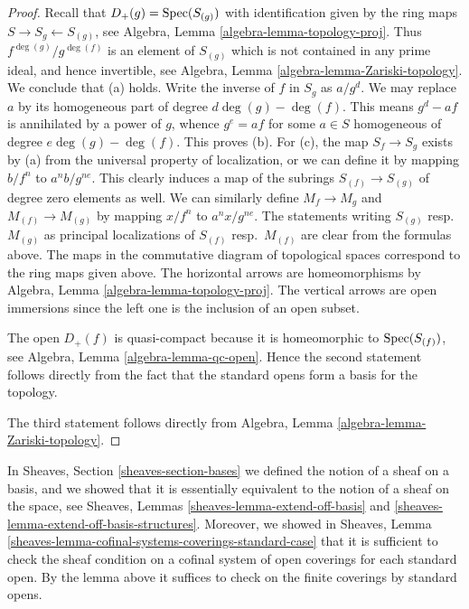 \begin{proof}
Recall that $D_{+}(g) = \mathop{\rm Spec}(S_{(g)})$ with identification
given by the ring maps $S \to S_g \leftarrow S_{(g)}$, see
Algebra, Lemma \ref{algebra-lemma-topology-proj}.
Thus $f^{\deg(g)}/g^{\deg(f)}$ is an element of $S_{(g)}$ which is not
contained in any prime ideal, and hence invertible,
see Algebra, Lemma \ref{algebra-lemma-Zariski-topology}.
We conclude that (a) holds.
Write the inverse of $f$ in $S_g$ as $a/g^d$.
We may replace $a$ by its homogeneous part of degree $d\deg(g) - \deg(f)$.
This means $g^d - af$ is annihilated by a power of $g$, whence
$g^e = af$ for some $a \in S$ homogeneous of degree $e\deg(g) - \deg(f)$.
This proves (b).
For (c), the map $S_f \to S_g$ exists by (a) from the universal property
of localization, or we can define it by mapping $b/f^n$
to $a^nb/g^{ne}$. This clearly induces a map of the subrings
$S_{(f)} \to S_{(g)}$ of degree zero elements as well.
We can similarly define $M_f \to M_g$ and $M_{(f)} \to M_{(g)}$ by mapping
$x/f^n$ to $a^nx/g^{ne}$. The statements writing $S_{(g)}$ resp.\ 
$M_{(g)}$ as principal localizations of $S_{(f)}$ resp.\ $M_{(f)}$
are clear from the formulas above. The maps in the commutative diagram
of topological spaces correspond to the ring maps given above. The
horizontal arrows are homeomorphisms by
Algebra, Lemma \ref{algebra-lemma-topology-proj}.
The vertical arrows are open immersions since the left
one is the inclusion of an open subset.

\medskip\noindent
The open $D_{+}(f)$ is quasi-compact because it is homeomorphic
to $\mathop{\rm Spec}(S_{(f)})$, see  Algebra, Lemma \ref{algebra-lemma-qc-open}.
Hence the second statement follows directly
from the fact that the standard opens form
a basis for the topology.

\medskip\noindent
The third statement follows directly from
Algebra, Lemma \ref{algebra-lemma-Zariski-topology}.
\end{proof}

\noindent
In Sheaves, Section \ref{sheaves-section-bases} we defined
the notion of a sheaf on a basis, and we showed that it is
essentially equivalent to the notion of a sheaf on the space,
see Sheaves, Lemmas \ref{sheaves-lemma-extend-off-basis} and
\ref{sheaves-lemma-extend-off-basis-structures}. Moreover,
we showed in
Sheaves, Lemma \ref{sheaves-lemma-cofinal-systems-coverings-standard-case}
that it is sufficient to check the sheaf
condition on a cofinal system of open coverings for each
standard open. By the lemma above it suffices to check
on the finite coverings by standard opens.

